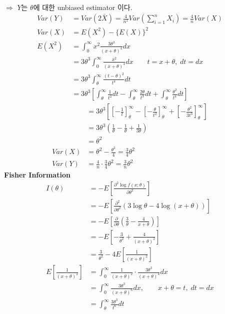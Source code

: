 \documentclass{oblivoir}
\newcommand{\flr}[1]{\left ( #1 \right )}
\newcommand{\tlr}[1]{\left [ #1 \right]}
\begin{document}
\begin{enumerate}
\begin{align*}
\end{align*}
$\Rightarrow$ $Y$는 $\theta$에 대한 unbiased estimator 이다.
\begin{align*}
Var(Y) &= Var(2\bar{X}) = \frac{4}{n^2} Var\flr{\sum_{i=1}^n X_i} = \frac{4}{n} Var(X) \\
Var(X) &= E(X^2) - \{ E(X) \}^2 \\
E(X^2) &= \int_0^{\infty} x^2 \frac{3\theta^3}{(x+\theta)^4} dx \\
&= 3\theta^3 \int_0^{\infty} \frac{x^2}{(x+\theta)^4} dx \qquad t = x + \theta, \; dt = dx \\
&= 3\theta^3 \int_{\theta}^{\infty} \frac{(t-\theta)^2}{t^4} dt \\
&= 3\theta^3 \tlr{\int_{\theta}^{\infty} \frac{1}{t^2} dt - \int_{\theta}^{\infty} \frac{2\theta}{t^3} dt  + \int_{\theta}^{\infty} \frac{\theta^2}{t^4} dt} 
\end{align*}
\begin{align*}
\quad &= 3\theta^3 \tlr{\tlr{-\frac{1}{t}}_{\theta}^{\infty} - \tlr{- \frac{\theta}{t^2}}_{\theta}^{\infty} + \tlr{-\frac{\theta^2}{3t^3}}_{\theta}^{\infty}} \\
&= 3\theta^3 \flr{\frac{1}{\theta} - \frac{1}{\theta} + \frac{1}{3\theta}} \\
&= \theta^2 \\
Var(X) &= \theta^2 - \frac{\theta^2}{4} = \frac{3}{4} \theta^2 \\
Var(Y) &= \frac{4}{n} \cdot \frac{3}{4} \theta^2 = \frac{3}{n} \theta^2
\end{align*}
\textbf{Fisher Information}
\begin{align*}
I(\theta) &= -E\tlr{\frac{\partial^2 \log f(x;\theta)}{\partial \theta^2}}  \\
&= -E\tlr{\frac{\partial^2}{\partial \theta^2}(3\log\theta - 4\log(x+\theta))} \\
&= -E\tlr{\frac{\partial}{\partial \theta}\flr{\frac{3}{\theta} - \frac{4}{x+\theta}}} \\
&= -E\tlr{-\frac{3}{\theta^2}  + \frac{4}{(x+\theta)^2}} \\
&= \frac{3}{\theta^2} - 4 E\tlr{\frac{1}{(x+\theta)^2}} \\
E\tlr{\frac{1}{(x+\theta)^2}} &= \int_0^{\infty} \frac{1}{(x+\theta)^2} \cdot \frac{3\theta^3}{(x+\theta)^4} dx \\
&= \int_0^{\infty} \frac{3\theta^3}{(x+\theta)^6} dx, \qquad x + \theta = t, \; dt = dx \\
&= \int_{\theta}^{\infty} \frac{3\theta^3}{t^6} dt \\

\end{align*}
\end{enumerate}
\end{document}
